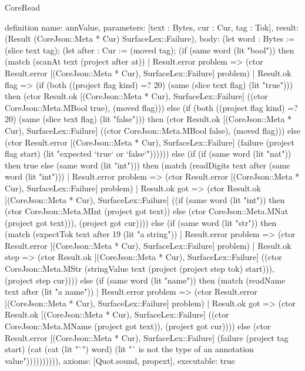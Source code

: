 \begin{lexlean}{CoreRead}
\begin{semanticmodule}
definition{
  name: annValue,
  parameters: [text : Bytes, cur : Cur, tag : Tok],
  result: (Result (CoreJson::Meta * Cur) SurfaceLex::Failure),
  body: (let word : Bytes := (slice text tag); (let after : Cur := (moved tag); (if (same word (lit "bool")) then (match (scanAt text (project after at))
    | Result.error problem => (ctor Result.error [(CoreJson::Meta * Cur), SurfaceLex::Failure] problem)
    | Result.ok flag => (if (both ((project flag kind) =? 20) (same (slice text flag) (lit "true"))) then (ctor Result.ok [(CoreJson::Meta * Cur), SurfaceLex::Failure] ((ctor CoreJson::Meta.MBool true), (moved flag))) else (if (both ((project flag kind) =? 20) (same (slice text flag) (lit "false"))) then (ctor Result.ok [(CoreJson::Meta * Cur), SurfaceLex::Failure] ((ctor CoreJson::Meta.MBool false), (moved flag))) else (ctor Result.error [(CoreJson::Meta * Cur), SurfaceLex::Failure] (failure (project flag start) (lit "expected `true` or `false`")))))) else (if (if (same word (lit "nat")) then true else (same word (lit "int"))) then (match (readDigits text after (same word (lit "int")))
    | Result.error problem => (ctor Result.error [(CoreJson::Meta * Cur), SurfaceLex::Failure] problem)
    | Result.ok got => (ctor Result.ok [(CoreJson::Meta * Cur), SurfaceLex::Failure] ((if (same word (lit "int")) then (ctor CoreJson::Meta.MInt (project got text)) else (ctor CoreJson::Meta.MNat (project got text))), (project got cur)))) else (if (same word (lit "str")) then (match (expectTok text after 19 (lit "a string"))
    | Result.error problem => (ctor Result.error [(CoreJson::Meta * Cur), SurfaceLex::Failure] problem)
    | Result.ok step => (ctor Result.ok [(CoreJson::Meta * Cur), SurfaceLex::Failure] ((ctor CoreJson::Meta.MStr (stringValue text (project (project step tok) start))), (project step cur)))) else (if (same word (lit "name")) then (match (readName text after (lit "a name"))
    | Result.error problem => (ctor Result.error [(CoreJson::Meta * Cur), SurfaceLex::Failure] problem)
    | Result.ok got => (ctor Result.ok [(CoreJson::Meta * Cur), SurfaceLex::Failure] ((ctor CoreJson::Meta.MName (project got text)), (project got cur)))) else (ctor Result.error [(CoreJson::Meta * Cur), SurfaceLex::Failure] (failure (project tag start) (cat (cat (lit "`") word) (lit "` is not the type of an annotation value")))))))))),
  axioms: [Quot.sound, propext],
  executable: true
}


\end{semanticmodule}
\end{lexlean}
